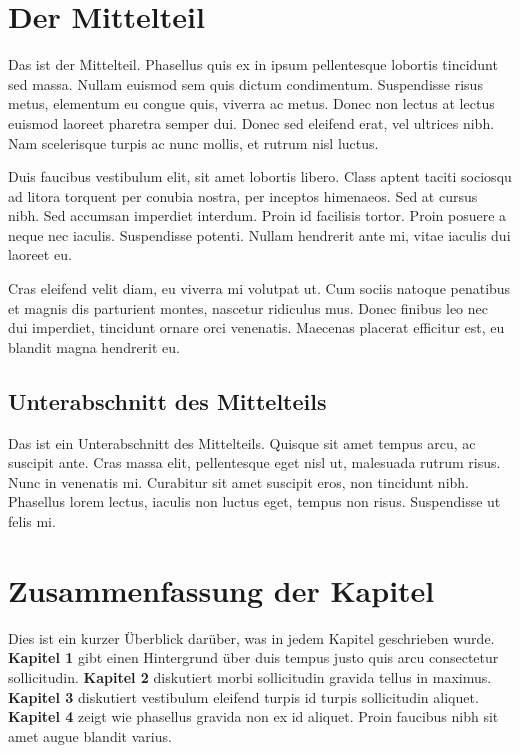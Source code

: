 \documentclass[listof=totoc,index=totoc,bibliography=totoc,12pt,german,a4paper,]{report}
\begin{document}
\section{Der Mittelteil}\label{der-mittelteil}

Das ist der Mittelteil. Phasellus quis ex in ipsum pellentesque lobortis
tincidunt sed massa. Nullam euismod sem quis dictum condimentum.
Suspendisse risus metus, elementum eu congue quis, viverra ac metus.
Donec non lectus at lectus euismod laoreet pharetra semper dui. Donec
sed eleifend erat, vel ultrices nibh. Nam scelerisque turpis ac nunc
mollis, et rutrum nisl luctus.

Duis faucibus vestibulum elit, sit amet lobortis libero. Class aptent
taciti sociosqu ad litora torquent per conubia nostra, per inceptos
himenaeos. Sed at cursus nibh. Sed accumsan imperdiet interdum. Proin id
facilisis tortor. Proin posuere a neque nec iaculis. Suspendisse
potenti. Nullam hendrerit ante mi, vitae iaculis dui laoreet eu.

Cras eleifend velit diam, eu viverra mi volutpat ut. Cum sociis natoque
penatibus et magnis dis parturient montes, nascetur ridiculus mus. Donec
finibus leo nec dui imperdiet, tincidunt ornare orci venenatis. Maecenas
placerat efficitur est, eu blandit magna hendrerit eu.

\subsection{Unterabschnitt des
Mittelteils}\label{unterabschnitt-des-mittelteils}

Das ist ein Unterabschnitt des Mittelteils. Quisque sit amet tempus
arcu, ac suscipit ante. Cras massa elit, pellentesque eget nisl ut,
malesuada rutrum risus. Nunc in venenatis mi. Curabitur sit amet
suscipit eros, non tincidunt nibh. Phasellus lorem lectus, iaculis non
luctus eget, tempus non risus. Suspendisse ut felis mi.

\section{Zusammenfassung der Kapitel}\label{zusammenfassung-der-kapitel}

Dies ist ein kurzer Überblick darüber, was in jedem Kapitel geschrieben
wurde. \textbf{Kapitel 1} gibt einen Hintergrund über duis tempus justo
quis arcu consectetur sollicitudin. \textbf{Kapitel 2} diskutiert morbi
sollicitudin gravida tellus in maximus. \textbf{Kapitel 3} diskutiert
vestibulum eleifend turpis id turpis sollicitudin aliquet.
\textbf{Kapitel 4} zeigt wie phasellus gravida non ex id aliquet. Proin
faucibus nibh sit amet augue blandit varius.
\end{document}
